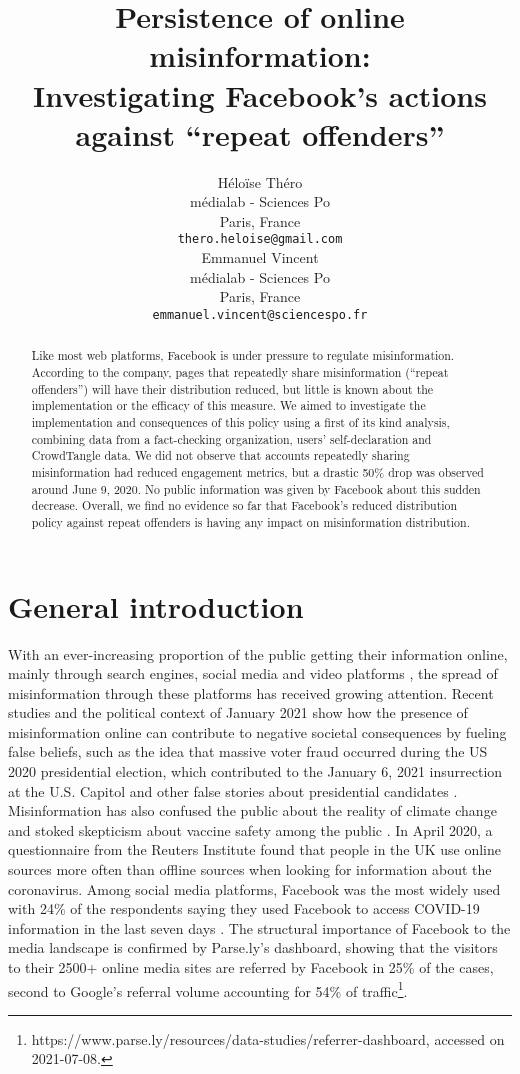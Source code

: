\documentclass[11pt,a4paper]{article}
\title{Persistence of online misinformation: \\ Investigating Facebook's actions against ``repeat offenders''}
\author{Héloïse Théro \\
  médialab - Sciences Po \\
  Paris, France \\
  \texttt{thero.heloise@gmail.com} \\\And
  Emmanuel Vincent \\
  médialab - Sciences Po \\
  Paris, France \\
  \texttt{emmanuel.vincent@sciencespo.fr} \\}
\date{}
\begin{document}
\maketitle

\begin{abstract}
Like most web platforms, Facebook is under pressure to regulate misinformation. According to the company, pages that repeatedly share misinformation (“repeat offenders”) will have their distribution reduced, but little is known about the implementation or the efficacy of this measure. We aimed to investigate the implementation and consequences of this policy using a first of its kind analysis, combining data from a fact-checking organization, users’ self-declaration and CrowdTangle data. We did not observe that accounts repeatedly sharing misinformation had reduced engagement metrics, but a drastic 50\% drop was observed around June 9, 2020. No public information was given by Facebook about this sudden decrease. Overall, we find no evidence so far that Facebook’s reduced distribution policy against repeat offenders is having any impact on misinformation distribution.
\end{abstract}

\section{General introduction}

With an ever-increasing proportion of the public getting their information online, mainly through search engines, social media and video platforms \citep{mitchell2016modern}, the spread of misinformation through these platforms has received growing attention. Recent studies and the political context of January 2021 show how the presence of misinformation online can contribute to negative societal consequences by fueling false beliefs, such as the idea that massive voter fraud occurred during the US 2020 presidential election, which contributed to the January 6, 2021 insurrection at the U.S. Capitol \citep{benkler2020mail} and other false stories about presidential candidates \citep{allcott2017social}. Misinformation has also confused the public about the reality of climate change \citep{brulle30years, porter2019can} and stoked skepticism about vaccine safety among the public \citep{featherstone2020feeling, lahouati2020spread}. In April 2020, a questionnaire from the Reuters Institute found that people in the UK use online sources more often than offline sources when looking for information about the coronavirus. Among social media platforms, Facebook was the most widely used with 24\% of the respondents saying they used Facebook to access COVID-19 information in the last seven days \citep{fletcher2020information}. The structural importance of Facebook to the media landscape is confirmed by Parse.ly’s dashboard, showing that the visitors to their 2500+ online media sites are referred by Facebook in 25\% of the cases, second to Google’s referral volume accounting for 54\% of traffic\footnote{https://www.parse.ly/resources/data-studies/referrer-dashboard, accessed on 2021-07-08.}.
\end{document}
